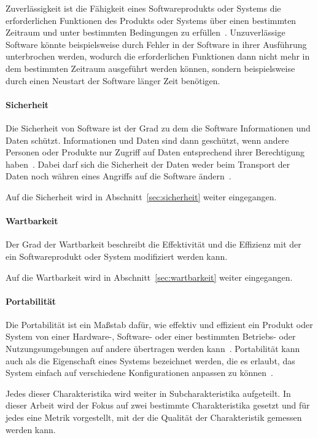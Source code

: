 \documentclass[12pt, a4paper, ngerman]{article}
\begin{document}
Zuverlässigkeit ist die Fähigkeit eines Softwareprodukts oder Systems
die erforderlichen Funktionen des Produkts oder Systems über einen bestimmten Zeitraum 
und unter bestimmten Bedingungen zu erfüllen~\cite{ISO25010}.
Unzuverlässige Software könnte beispielsweise durch Fehler in der Software
in ihrer Ausführung unterbrochen werden, wodurch die erforderlichen Funktionen
dann nicht mehr in dem bestimmten Zeitraum ausgeführt werden können,
sondern beispielsweise durch einen Neustart der Software länger Zeit benötigen.

\paragraph{Sicherheit}

Die Sicherheit von Software ist der Grad zu dem die Software Informationen und Daten schützt.
Informationen und Daten sind dann geschützt,
wenn andere Personen oder Produkte nur Zugriff auf Daten 
entsprechend ihrer Berechtigung haben~\cite{ISO25010}.
Dabei darf sich die Sicherheit der Daten weder beim Transport der Daten
noch währen eines Angriffs auf die Software ändern~\cite{ISO25010}.

Auf die Sicherheit wird in Abschnitt~\ref{sec:sicherheit} weiter eingegangen.

\paragraph{Wartbarkeit}

Der Grad der Wartbarkeit beschreibt die Effektivität und die Effizienz
mit der ein Softwareprodukt oder System modifiziert werden kann.

Auf die Wartbarkeit wird in Abschnitt~\ref{sec:wartbarkeit} weiter eingegangen.

\paragraph{Portabilität}

Die Portabilität ist ein Maßstab dafür, 
wie effektiv und effizient ein Produkt oder System von einer Hardware-,
Software- oder einer bestimmten Betriebs- oder Nutzungsumgebungen auf andere übertragen werden kann~\cite{ISO25010}.
Portabilität kann auch als die Eigenschaft eines Systems bezeichnet werden,
die es erlaubt, das System einfach auf verschiedene Konfigurationen anpassen zu können~\cite{IEEE24765}.


Jedes dieser Charakteristika wird weiter in Subcharakteristika aufgeteilt.
In dieser Arbeit wird der Fokus auf zwei bestimmte Charakteristika gesetzt
und für jedes eine Metrik vorgestellt,
mit der die Qualität der Charakteristik gemessen werden kann.
\end{document}
